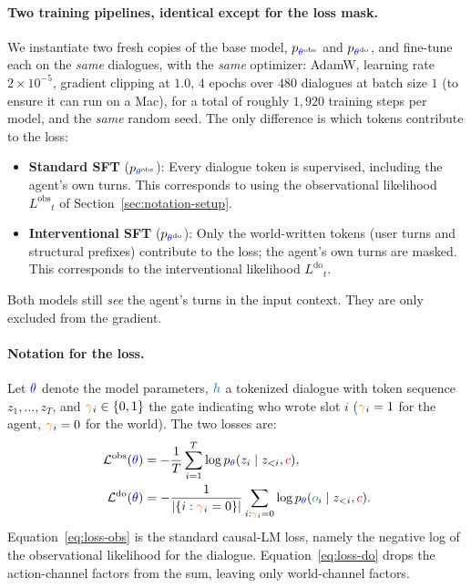 \documentclass[11pt]{article}
\newcommand{\obs}{\ensuremath{\textcolor{ForestGreen}{o}}}
\newcommand{\contextsym}{\ensuremath{\textcolor{purple}{c}}}
\newcommand{\gate}{\ensuremath{\textcolor{orange}{\gamma}}}
\newcommand{\history}{\ensuremath{\textcolor{RoyalBlue}{h}}}
\newcommand{\token}{\ensuremath{z}}
\newcommand{\thetap}{\ensuremath{\textcolor{blue}{\theta}}}
\newcommand{\sftloss}{\ensuremath{\mathcal{L}}}
\newcommand{\obssft}{\ensuremath{\sftloss^{\mathrm{obs}}}}
\newcommand{\dosft}{\ensuremath{\sftloss^{\mathrm{do}}}}
\newcommand{\lik}{\ensuremath{L}}
\newcommand{\obslik}{\ensuremath{\lik^{\mathrm{obs}}}}
\newcommand{\dolik}{\ensuremath{\lik^{\mathrm{do}}}}
\begin{document}
\paragraph{Two training pipelines, identical except for the loss mask.}
We instantiate two fresh copies of the base model, $p_{{\thetap}^{\mathrm{obs}}}$
and $p_{{\thetap}^{\mathrm{do}}}$, and fine-tune each on the \emph{same}
dialogues, with the \emph{same} optimizer: AdamW, learning rate
$2\times 10^{-5}$, gradient clipping at $1.0$, $4$ epochs over $480$
dialogues at batch size $1$ (to ensure it can run on a Mac), for a total of roughly $1{,}920$ training steps
per model, and the \emph{same} random seed. The only difference is which
tokens contribute to the loss:
\begin{itemize}[leftmargin=2em,itemsep=2pt]
  \item \textbf{Standard SFT} ($p_{{\thetap}^{\mathrm{obs}}}$): Every dialogue
        token is supervised, including the agent's own turns. This corresponds
        to using the observational likelihood $\obslik_t$ of
        Section~\ref{sec:notation-setup}.
  \item \textbf{Interventional SFT} ($p_{{\thetap}^{\mathrm{do}}}$): Only the
        world-written tokens (user turns and structural prefixes) contribute
        to the loss; the agent's own turns are masked. This corresponds to the
        interventional likelihood $\dolik_t$.
\end{itemize}
Both models still \emph{see} the agent's turns in the input
context. They are only excluded from the gradient.

\paragraph{Notation for the loss.}
Let ${\thetap}$ denote the model parameters, $\history$ a tokenized dialogue with
token sequence $\token_1,\ldots,\token_T$, and $\gate_i\in\{0,1\}$ the gate
indicating who wrote slot $i$ ($\gate_i=1$ for the agent, $\gate_i=0$ for the
world). The two losses are:
\begin{align}
\obssft({\thetap})
&=
-\frac{1}{T}\sum_{i=1}^{T}
\log p_{\thetap}(\token_i\mid \token_{<i},\contextsym),
\label{eq:loss-obs}\\
\dosft({\thetap})
&=
-\frac{1}{|\{i:\gate_i=0\}|}\sum_{i:\gate_i=0}
\log p_{\thetap}(\obs_i\mid \token_{<i},\contextsym).
\label{eq:loss-do}
\end{align}
Equation~\eqref{eq:loss-obs} is the standard causal-LM loss, namely the negative log
of the observational likelihood for the dialogue. Equation~\eqref{eq:loss-do}
drops the action-channel factors from the sum, leaving only world-channel
factors. 
\end{document}
